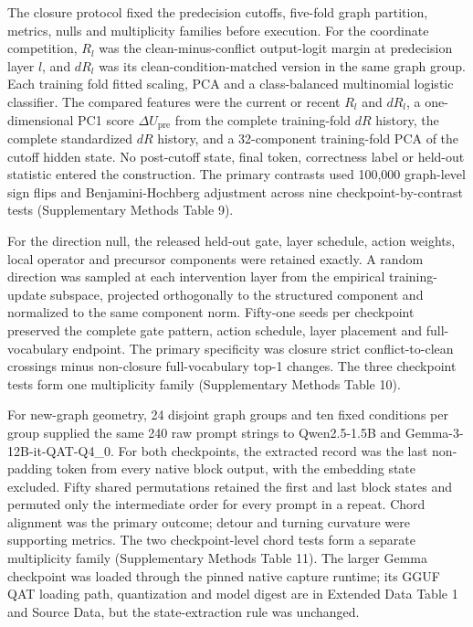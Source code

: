 \documentclass[12pt]{article}
\begin{document}
The closure protocol fixed the predecision cutoffs, five-fold graph partition, metrics, nulls and multiplicity families before execution. For the coordinate competition, \(R_l\) was the clean-minus-conflict output-logit margin at predecision layer \(l\), and \(dR_l\) was its clean-condition-matched version in the same graph group. Each training fold fitted scaling, PCA and a class-balanced multinomial logistic classifier. The compared features were the current or recent \(R_l\) and \(dR_l\), a one-dimensional PC1 score \(\Delta U_{\mathrm{pre}}\) from the complete training-fold \(dR\) history, the complete standardized \(dR\) history, and a 32-component training-fold PCA of the cutoff hidden state. No post-cutoff state, final token, correctness label or held-out statistic entered the construction. The primary contrasts used 100,000 graph-level sign flips and Benjamini-Hochberg adjustment across nine checkpoint-by-contrast tests (Supplementary Methods Table 9).

For the direction null, the released held-out gate, layer schedule, action weights, local operator and precursor components were retained exactly. A random direction was sampled at each intervention layer from the empirical training-update subspace, projected orthogonally to the structured component and normalized to the same component norm. Fifty-one seeds per checkpoint preserved the complete gate pattern, action schedule, layer placement and full-vocabulary endpoint. The primary specificity was closure strict conflict-to-clean crossings minus non-closure full-vocabulary top-1 changes. The three checkpoint tests form one multiplicity family (Supplementary Methods Table 10).

For new-graph geometry, 24 disjoint graph groups and ten fixed conditions per group supplied the same 240 raw prompt strings to Qwen2.5-1.5B and Gemma-3-12B-it-QAT-Q4\_0. For both checkpoints, the extracted record was the last non-padding token from every native block output, with the embedding state excluded. Fifty shared permutations retained the first and last block states and permuted only the intermediate order for every prompt in a repeat. Chord alignment was the primary outcome; detour and turning curvature were supporting metrics. The two checkpoint-level chord tests form a separate multiplicity family (Supplementary Methods Table 11). The larger Gemma checkpoint was loaded through the pinned native capture runtime; its GGUF QAT loading path, quantization and model digest are in Extended Data Table 1 and Source Data, but the state-extraction rule was unchanged.
\end{document}
